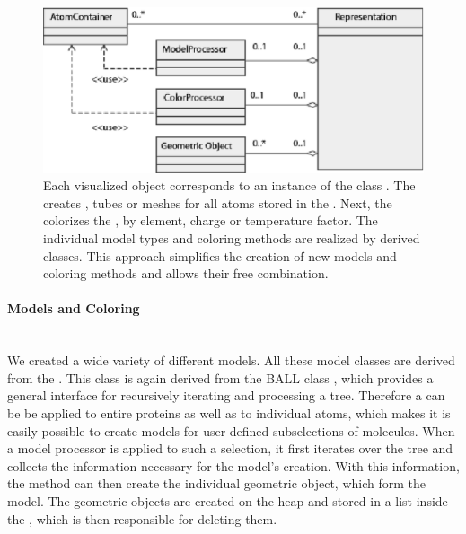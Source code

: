 \begin{figure}[ht] %
\centering
\includegraphics[width=1.\textwidth]{representation.eps}
\caption[UML diagram for the  class]
{Each visualized object corresponds to an instance of the class 
. The  creates 
, \eg tubes or meshes for all atoms stored in the
. Next, the  colorizes the 
, \eg by element, charge or temperature factor. The
individual model types and coloring methods are realized by derived classes.
This approach simplifies the creation of new models and coloring methods and 
allows their free combination.}
\label{fig:representation}
\end{figure}

\paragraph{Models and Coloring}
\hspace*{\fill}\\
We created a wide variety of different models. All these model classes are 
derived from the . This class is again derived from 
the BALL class , which provides a 
general interface for recursively iterating and processing a  
tree. Therefore a  can be be applied to entire 
proteins as well as to individual atoms, which makes it is easily possible to 
create models for user defined subselections of molecules. When a model 
processor is applied to such a selection, it first iterates over the 
 tree and collects the information necessary for the model's 
creation. With this information, the method 
 can then create the individual geometric 
object, which form the model. The geometric objects are created on the heap 
and stored in a list inside the , which is then 
responsible for deleting them.

